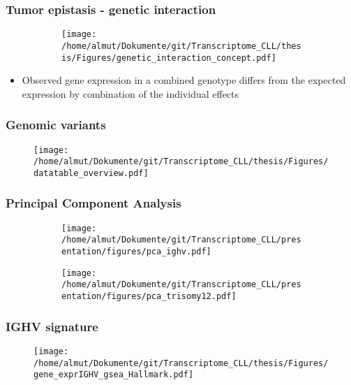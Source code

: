 \documentclass[xcolor=dvipsnames,t,10pt]{beamer}
\begin{document}
\begin{frame}[c]
	\frametitle{Tumor epistasis - genetic interaction}
	\begin{figure}
		\centering
		\begin{subfigure}[t]{0.45\columnwidth}
			\texttt{[image: /home/almut/Dokumente/git/Transcriptome\_CLL/thesis/Figures/genetic\_interaction\_concept.pdf]}
		\end{subfigure}
	\end{figure}
	\begin{itemize}
		\item Observed gene expression in a combined genotype differs from the expected expression by combination of the individual effects
	\end{itemize}
\end{frame}
%
\begin{frame}[c]
	\frametitle{Genomic variants}
	\begin{figure}
		\centering
		\texttt{[image: /home/almut/Dokumente/git/Transcriptome\_CLL/thesis/Figures/datatable\_overview.pdf]}
	\end{figure}
\end{frame}
%
%
\begin{frame}[c]
	\frametitle{Principal Component Analysis}
	\begin{figure}
		\centering
		\begin{subfigure}[t]{0.45\columnwidth}
			\texttt{[image: /home/almut/Dokumente/git/Transcriptome\_CLL/presentation/figures/pca\_ighv.pdf]}
		\end{subfigure}
		\hfill
		\begin{subfigure}[t]{0.45\columnwidth}
			\texttt{[image: /home/almut/Dokumente/git/Transcriptome\_CLL/presentation/figures/pca\_trisomy12.pdf]}
		\end{subfigure}
	\end{figure}
\end{frame}
% 
%
\begin{frame}[c]
	\frametitle{IGHV signature}
	\begin{figure}
		\centering
		\texttt{[image: /home/almut/Dokumente/git/Transcriptome\_CLL/thesis/Figures/gene\_exprIGHV\_gsea\_Hallmark.pdf]}
	\end{figure}
\end{frame}
\end{document}
